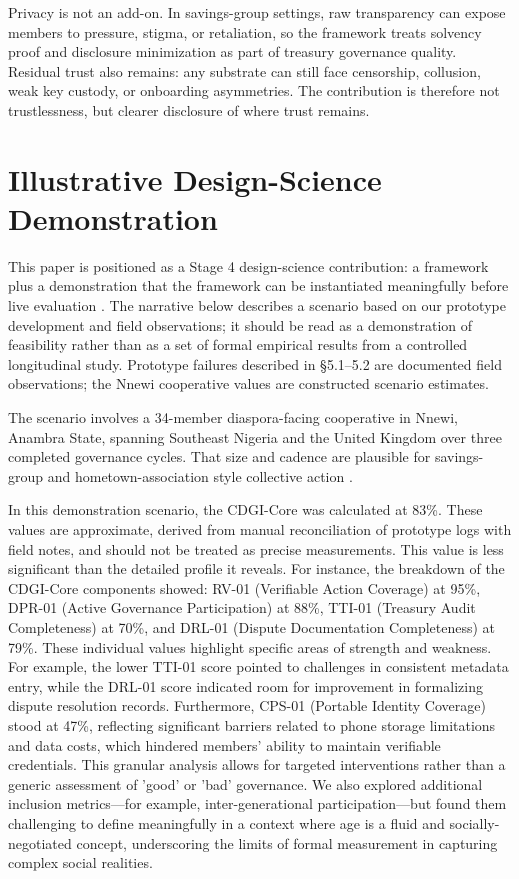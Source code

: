 \documentclass[sigconf]{acmart}
\begin{document}
Privacy is not an add-on. In savings-group settings, raw transparency can expose members to pressure, stigma, or retaliation, so the framework treats solvency proof and disclosure minimization as part of treasury governance quality. Residual trust also remains: any substrate can still face censorship, collusion, weak key custody, or onboarding asymmetries. The contribution is therefore not trustlessness, but clearer disclosure of where trust remains.

\section{Illustrative Design-Science Demonstration}


This paper is positioned as a Stage 4 design-science contribution: a framework plus a demonstration that the framework can be instantiated meaningfully before live evaluation \cite{hevner2004, peffers2007, dresch2015}. The narrative below describes a scenario based on our prototype development and field observations; it should be read as a demonstration of feasibility rather than as a set of formal empirical results from a controlled longitudinal study. Prototype failures described in §5.1–5.2 are documented field observations; the Nnewi cooperative values are constructed scenario estimates.

The scenario involves a 34-member diaspora-facing cooperative in Nnewi, Anambra State, spanning Southeast Nigeria and the United Kingdom over three completed governance cycles. That size and cadence are plausible for savings-group and hometown-association style collective action \cite{besley1993}.

In this demonstration scenario, the CDGI-Core was calculated at 83\%. These values are approximate, derived from manual reconciliation of prototype logs with field notes, and should not be treated as precise measurements. This value is less significant than the detailed profile it reveals. For instance, the breakdown of the CDGI-Core components showed: RV-01 (Verifiable Action Coverage) at 95\%, DPR-01 (Active Governance Participation) at 88\%, TTI-01 (Treasury Audit Completeness) at 70\%, and DRL-01 (Dispute Documentation Completeness) at 79\%. These individual values highlight specific areas of strength and weakness. For example, the lower TTI-01 score pointed to challenges in consistent metadata entry, while the DRL-01 score indicated room for improvement in formalizing dispute resolution records. Furthermore, CPS-01 (Portable Identity Coverage) stood at 47\%, reflecting significant barriers related to phone storage limitations and data costs, which hindered members’ ability to maintain verifiable credentials. This granular analysis allows for targeted interventions rather than a generic assessment of 'good' or 'bad' governance. We also explored additional inclusion metrics---for example, inter-generational participation---but found them challenging to define meaningfully in a context where age is a fluid and socially-negotiated concept, underscoring the limits of formal measurement in capturing complex social realities.
\end{document}
